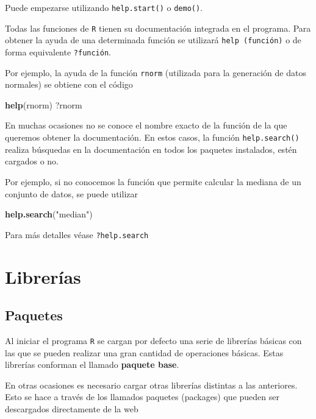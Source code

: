 \documentclass[]{book}
\newenvironment{Shaded}{\begin{snugshade}}{\end{snugshade}}
\newcommand{\KeywordTok}[1]{\textcolor[rgb]{0.13,0.29,0.53}{\textbf{#1}}}
\newcommand{\StringTok}[1]{\textcolor[rgb]{0.31,0.60,0.02}{#1}}
\newcommand{\NormalTok}[1]{#1}
\begin{document}
Puede empezarse utilizando \texttt{help.start()} o \texttt{demo()}.

Todas las funciones de \texttt{R} tienen su documentación integrada en
el programa. Para obtener la ayuda de una determinada función se
utilizará \texttt{help\ (función)} o de forma equivalente
\texttt{?función}.

Por ejemplo, la ayuda de la función \texttt{rnorm} (utilizada para la
generación de datos normales) se obtiene con el código

\begin{Shaded}
\begin{Highlighting}[]
\KeywordTok{help}\NormalTok{(rnorm)}
\NormalTok{?rnorm}
\end{Highlighting}
\end{Shaded}

En muchas ocasiones no se conoce el nombre exacto de la función de la
que queremos obtener la documentación. En estos casos, la función
\texttt{help.search()} realiza búsquedas en la documentación en todos
los paquetes instalados, estén cargados o no.

Por ejemplo, si no conocemos la función que permite calcular la mediana
de un conjunto de datos, se puede utilizar

\begin{Shaded}
\begin{Highlighting}[]
\KeywordTok{help.search}\NormalTok{(}\StringTok{"median"}\NormalTok{)}
\end{Highlighting}
\end{Shaded}

Para más detalles véase \texttt{?help.search}

\section{Librerías}\label{librerias}

\subsection{Paquetes}\label{paquetes}

Al iniciar el programa \texttt{R} se cargan por defecto una serie de
librerías básicas con las que se pueden realizar una gran cantidad de
operaciones básicas. Estas librerías conforman el llamado
\textbf{paquete base}.

En otras ocasiones es necesario cargar otras librerías distintas a las
anteriores. Esto se hace a través de los llamados paquetes (packages)
que pueden ser descargados directamente de la web
\end{document}
